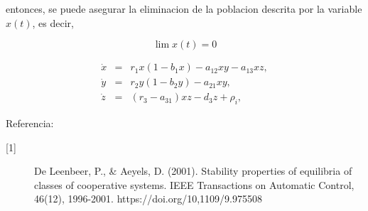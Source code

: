 \documentclass[letterpaper,11pt]{article}
\begin{document}
entonces, se puede asegurar la eliminacion de la poblacion descrita por la
variable $x(t)$, es decir,

\begin{equation*}
\lim x(t)=0
\end{equation*}

\begin{eqnarray*}
\dot{x} &=&r_{1}x(1-b_{1}x)-a_{12}xy-a_{13}xz, \\
\dot{y} &=&r_{2}y(1-b_{2}y)-a_{21}xy, \\
\dot{z} &=&(r_{3}-a_{31})xz-d_{3}z+\rho _{i},
\end{eqnarray*}

Referencia:

\begin{description}
\item[{[1]}] De Leenbeer, P., \& Aeyels, D. (2001). Stability properties of
equilibria of classes of cooperative systems. IEEE Transactions on Automatic
Control, 46(12), 1996-2001. https://doi.org/10,1109/9.975508
\end{description}
\end{document}

